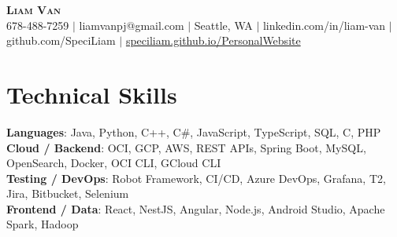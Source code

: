 \documentclass[letterpaper,11pt]{article}
\begin{document}

%
\begin{center}
    \textbf{\Huge \scshape Liam Van} \\ \vspace{1pt}
    \small 678-488-7259 $|$ \small {liamvanpj@gmail.com} $|$ Seattle, WA
 {{$|$ linkedin.com/in/liam-van} {$|$ github.com/SpeciLiam} {$|$ \href{https://speciliam.github.io/PersonalWebsite}{speciliam.github.io/PersonalWebsite}}}

\end{center}

\section{Technical Skills}
 \begin{itemize}[leftmargin=0.15in, label={}]
    \small{\item{
     \textbf{Languages}{: Java, Python, C++, C\#, JavaScript, TypeScript, SQL, C, PHP} \\
     \textbf{Cloud / Backend}{: OCI, GCP, AWS, REST APIs, Spring Boot, MySQL, OpenSearch, Docker, OCI CLI, GCloud CLI} \\
     \textbf{Testing / DevOps}{: Robot Framework, CI/CD, Azure DevOps, Grafana, T2, Jira, Bitbucket, Selenium} \\
     \textbf{Frontend / Data}{: React, NestJS, Angular, Node.js, Android Studio, Apache Spark, Hadoop} \\
    }}
 \end{itemize}
%

\end{document}
